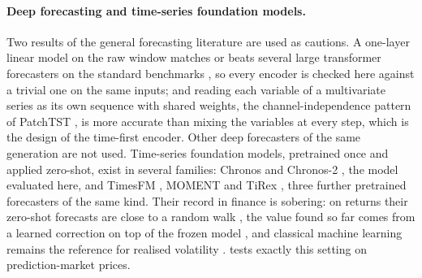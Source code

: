 \paragraph{Deep forecasting and time-series foundation models.}  Two results of the general
forecasting literature are used as cautions.  A one-layer linear model on the raw window
matches or beats several large transformer forecasters on the standard benchmarks
\cite{zeng2023transformers}, so every encoder is checked here against a trivial one on the
same inputs; and reading each variable of a multivariate series as its own sequence with
shared weights, the channel-independence pattern of PatchTST \cite{nie2023patchtst}, is more
accurate than mixing the variables at every step, which is the design of the time-first
encoder.  Other deep forecasters of the same generation \cite{challu2022nhits,lim2021tft}
are not used.  Time-series foundation models, pretrained once and applied zero-shot, exist in
several families: Chronos \cite{ansari2024chronos} and Chronos-2 \cite{ansari2025chronos2},
the model evaluated here, and TimesFM \cite{das2024timesfm}, MOMENT \cite{goswami2024moment}
and TiRex \cite{auer2025tirex}, three further pretrained forecasters of the same kind.  Their record in finance is sobering: on returns their zero-shot
forecasts are close to a random walk \cite{rahimikia2025revisiting,anon2026pretrained}, the
value found so far comes from a learned correction on top of the frozen model
\cite{dewage2026hybrid}, and classical machine learning remains the reference for realised
volatility \cite{rahimikia2026volatility}.   tests exactly this
setting on prediction-market prices.

